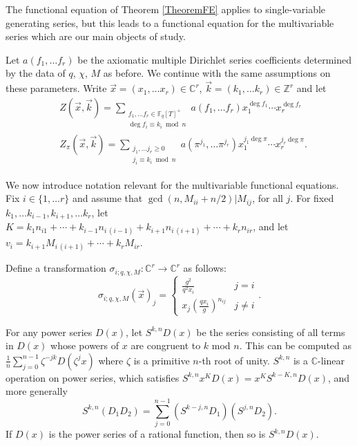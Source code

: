 \documentclass[11pt,letterpaper]{article}
\theoremstyle{definition}
\theoremstyle{remark}
\numberwithin{equation}{section}
\theoremstyle{dotless}
\newcommand{\C}{\mathbb{C}}
\newcommand{\Z}{\mathbb{Z}}
\newcommand{\F}{\mathbb{F}}
\begin{document}
The functional equation of Theorem \ref{TheoremFE} applies to single-variable generating series, but this leads to a functional equation for the multivariable series which are our main objects of study. 

Let $a(f_1, \ldots f_r)$ be the axiomatic multiple Dirichlet series coefficients determined by the data of $q$, $\chi$, $M$ as before. We continue with the same assumptions on these parameters. Write $\vec{x}=(x_1, \ldots x_r) \in \C^r$, $\vec{k}=(k_1, \ldots k_r) \in \Z^r$ and let 
\begin{align}
&Z(\vec{x}, \vec{k}) = \sum_{\substack{f_1, \ldots f_r \in \F_q[T]^+ \\ \deg f_i \equiv k_i \bmod n}} a(f_1,\ldots f_r) x_1^{\deg f_1} \cdots x_r^{\deg f_r} \\
&Z_{\pi}(\vec{x}, \vec{k}) = \sum_{\substack{j_1, \ldots j_r \geq 0 \\ j_i \equiv k_i \bmod n}} a(\pi^{j_1}, \ldots \pi^{j_r}) x_1^{j_1\deg \pi} \cdots x_r^{j_r \deg \pi}.
\end{align}

We now introduce notation relevant for the multivariable functional equations. Fix $i \in \{1, \ldots r\}$ and assume that $\gcd(n, M_{ii}+n/2) | M_{ij}$, for all $j$. For fixed $k_1, \ldots k_{i-1}, k_{i+1}, \ldots k_r$, let $K=k_1 n_{i1} + \cdots +k_{i-1} n_{i \, (i-1)} + k_{i+1} n_{i \, (i+1)} +\cdots + k_r n_{ir}$, and let $v_i=k_{i+1} M_{i \,(i+1)} +\cdots + k_r M_{i r}$.

Define a transformation $\sigma_{i; q, \chi, M}: \C^r \to \C^r$ as follows:
\begin{equation} \label{sigma-i-kubota}
\sigma_{i; q, \chi, M}(\vec{x})_j = \left\lbrace \begin{array}{cc} 
\frac{g^2}{q^2x_i} & j=i \\
x_j\left(\frac{q x_i}{g}\right)^{n_{ij}} & j \neq i \end{array} \right. .
\end{equation}

For any power series $D(x)$, let $S^{k, n} D(x)$ be the series consisting of all terms in $D(x)$ whose powers of $x$ are congruent to $k$ mod $n$. This can be computed as $\frac1n\sum\limits_{j=0}^{n-1} \zeta^{-jk} D(\zeta^j x)$ where $\zeta$ is a primitive $n$-th root of unity. $S^{k, n}$ is a $\C$-linear operation on power series, which satisfies $S^{k, n} x^K D(x) = x^K S^{k-K, n}D(x)$, and more generally
\begin{equation*}
S^{k, n} (D_1 D_2) = \sum_{j=0}^{n-1} (S^{k-j, n}D_1)(S^{j, n}D_2).
\end{equation*}
If $D(x)$ is the power series of a rational function, then so is $S^{k, n} D(x)$.
\end{document}
